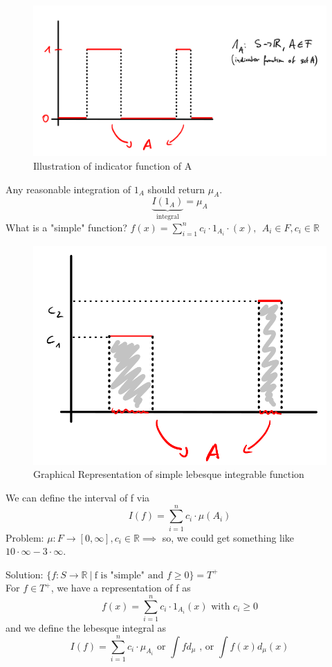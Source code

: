 \documentclass[10pt,a4paper]{article}
\theoremstyle{definition}
\theoremstyle{plain}
\begin{document}
\begin{figure}[H]
	\centering
	\includegraphics[width=0.7\linewidth]{leb_detail}
	\caption{Illustration of indicator function of A}
	\label{fig:lebdetail}
\end{figure}
Any reasonable integration of $1_A$ should return $\mu_A$.
$$ \underbrace{I(1_A)}_{\text{integral}} = \mu_A$$
What is a "simple" function? $ f(x) = \sum_{i=1}^{n} c_i \cdot 1_{A_{i}} \cdot (x), \ \ A_i \in F, c_i \in \mathbb{R}$\\
\begin{figure}[H]
	\centering
	\includegraphics[width=0.5\linewidth]{simple_leb}
	\caption{Graphical Representation of simple lebesque integrable function}
	\label{fig:simplefun}
\end{figure}


We can define the interval of f via
$$ I(f) = \sum_{i = 1}^{n} c_i \cdot \mu(A_i)$$
Problem: $\mu: F \to [0, \infty], c_i \in \mathbb{R} \implies$ so, we could get something like $10 \cdot \infty - 3 \cdot \infty$.\newline

Solution: $\{f: S \to \mathbb{R}\ \big| \ \text{f is "simple" and } f \geq 0\} = T^+
$\\

For $f \in T^+$, we have a representation of f as
$$f(x) = \sum_{i=1}^{n} c_i \cdot 1_{A_i}(x) \text{ with } c_i \geq 0$$
and we define the lebesque integral as 
$$ I(f) = \sum_{i=1}^{n} c_i \cdot \mu_{A_i} \text{ or } \int f d_{\mu} \text{ , or } \int f(x) d_{\mu}(x)$$
\end{document}
